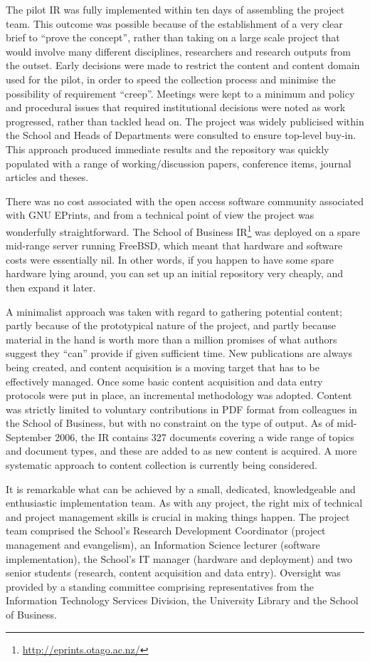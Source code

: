 \documentclass[12pt,pdftex,a4paper,titlepage]{article}
\begin{document}
The pilot IR was fully implemented within ten days of assembling the project team. This outcome was possible because of the establishment of a very clear brief to ``prove the concept'', rather than taking on a large scale project that would involve many different disciplines, researchers and research outputs from the outset. Early decisions were made to restrict the content and content domain used for the pilot, in order to speed the collection process and minimise the possibility of requirement ``creep''. Meetings were kept to a minimum and policy and procedural issues that required institutional decisions were noted as work progressed, rather than tackled head on. The project was widely publicised within the School and Heads of Departments were consulted to ensure top-level buy-in. This approach produced immediate results and the repository was quickly populated with a range of working/discussion papers, conference items, journal articles and theses.

There was no cost associated with the open access software community associated with GNU EPrints, and from a technical point of view the project was wonderfully straightforward. The School of Business IR\footnote{\url{http://eprints.otago.ac.nz/}} was deployed on a spare mid-range server running FreeBSD, which meant that hardware and software costs were essentially nil. In other words, if you happen to have some spare hardware lying around, you can set up an initial repository very cheaply, and then expand it later.

A minimalist approach was taken with regard to gathering potential content; partly because of the prototypical nature of the project, and partly because material in the hand is worth more than a million promises of what authors suggest they ``can'' provide if given sufficient time. New publications are always being created, and content acquisition is a moving target that has to be effectively managed. Once some basic content acquisition and data entry protocols were put in place, an incremental methodology was adopted. Content was strictly limited to voluntary contributions in PDF format from colleagues in the School of Business, but with no constraint on the type of output. As of mid-September 2006, the IR contains 327 documents covering a wide range of topics and document types, and these are added to as new content is acquired. A more systematic approach to content collection is currently being considered.

It is remarkable what can be achieved by a small, dedicated, knowledgeable and enthusiastic implementation team. As with any project, the right mix of technical and project management skills is crucial in making things happen. The project team comprised the School's Research Development Coordinator (project management and evangelism), an Information Science lecturer (software implementation), the School's IT manager (hardware and deployment) and two senior students (research, content acquisition and data entry). Oversight was provided by a standing committee comprising representatives from the Information Technology Services Division, the University Library and the School of Business.
\end{document}
